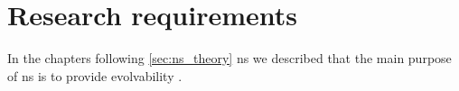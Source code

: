 \section{Research requirements} \label{sec:research_requirements} 

In the chapters following \ref{sec:ns_theory} \gls{ns} we described that the main purpose
of \gls{ns} is to provide evolvability \parencite[406]{mannaert_normalized_2016}.